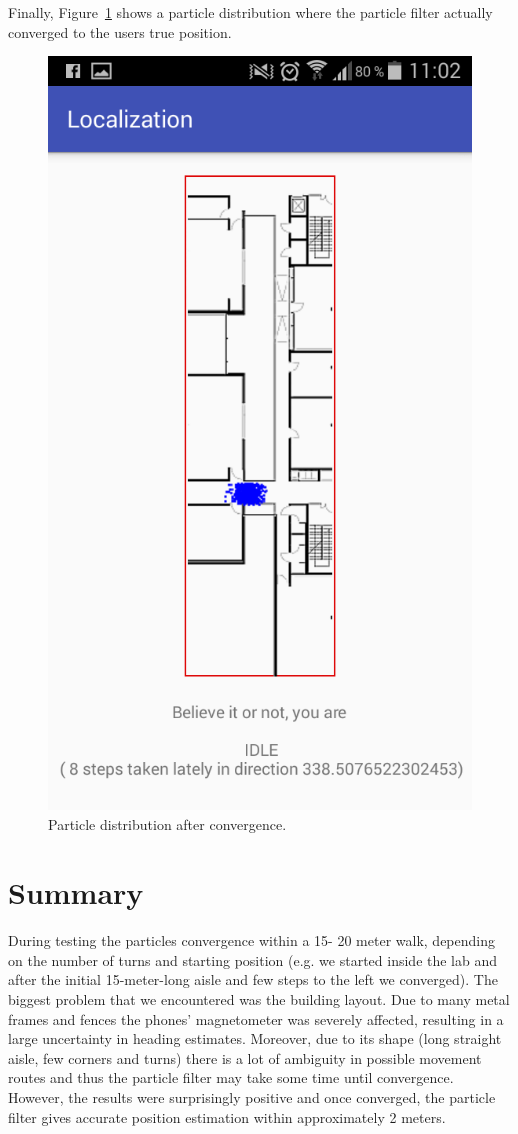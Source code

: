 \documentclass[conference]{IEEEtran}
\begin{document}
Finally, Figure~\ref{fig:converged} shows a particle distribution where the particle filter actually converged to the users true position.
\begin{figure}[!htp]
\begin{center}
\includegraphics[width=0.7\linewidth]{fig/converged}
\caption{Particle distribution after convergence.}\label{fig:converged}
\end{center}
\end{figure}

\section{Summary}
\label{sec:summary}
During testing the particles convergence within a 15- 20 meter walk, depending on the number of turns and starting position (e.g. we started inside the lab and after the initial 15-meter-long aisle and few steps to the left we converged). The biggest problem that we encountered was the building layout. Due to many metal frames and fences the phones' magnetometer was severely affected, resulting in a large uncertainty in heading estimates. Moreover, due to its shape (long straight aisle, few corners and turns) there is a lot of ambiguity in possible movement routes and thus the particle filter may take some time until convergence. However, the results were surprisingly positive and once converged, the particle filter gives accurate position estimation within approximately 2 meters.
\end{document}
